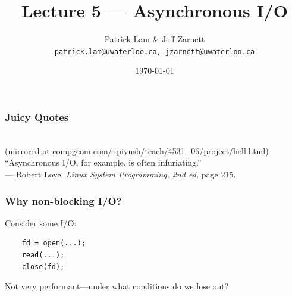 

\title{Lecture 5 --- Asynchronous I/O}

\author{Patrick Lam \& Jeff Zarnett \\ \small \texttt{patrick.lam@uwaterloo.ca, jzarnett@uwaterloo.ca}}
\date{\today}




\begin{frame}
  \titlepage

 \end{frame}

\begin{frame}
  \frametitle{Juicy Quotes}


  \\
{\scriptsize (mirrored at \url{compgeom.com/~piyush/teach/4531_06/project/hell.html})}
   \\[3em]

   ``Asynchronous I/O, for example, is often infuriating.''\\
--- Robert Love. {\em Linux System Programming, 2nd ed, } page 215.
  

\end{frame}

\begin{frame}[fragile]
  \frametitle{Why non-blocking I/O?}
  
  Consider some I/O:


\begin{minipage}{.5\textwidth}
\begin{lstlisting}
    fd = open(...);
    read(...);
    close(fd);
  \end{lstlisting}
\end{minipage}


  Not very performant---under what conditions do we lose out?

\end{frame}

